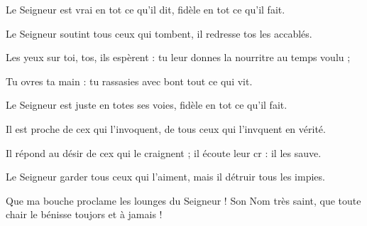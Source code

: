 \item Le Seigneur est vrai en tot ce qu’il dit,\psstar{} fidèle en tot ce qu’il fait.
\item Le Seigneur soutint tous ceux qui tombent,\psstar{} il redresse tos les accablés.
\item Les yeux sur toi, tos, ils espèrent :\psstar{} tu leur donnes la nourritre au temps voulu ;
\item Tu ovres ta main :\psstar{} tu rassasies avec bont tout ce qui vit.
\item Le Seigneur est juste en totes ses voies,\psstar{} fidèle en tot ce qu’il fait.
\item Il est proche de cex qui l’invoquent,\psstar{} de tous ceux qui l’invquent en vérité.
\item Il répond au désir de cex qui le craignent ;\psstar{} il écoute leur cr : il les sauve.
\item Le Seigneur garder tous ceux qui l’aiment,\psstar{} mais il détruir tous les impies.
\item Que ma bouche proclame les lounges du Seigneur !\psstar{} Son Nom très saint, que toute chair le bénisse toujors et à jamais !